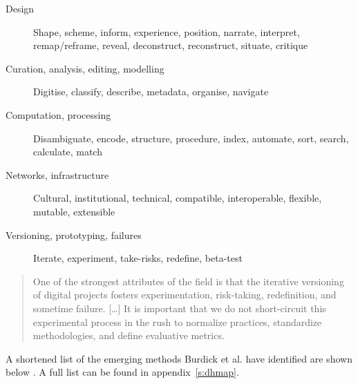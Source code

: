 \begin{description}
  \item [Design] Shape, scheme, inform, experience, position, narrate,
  					interpret, remap/reframe, reveal, deconstruct, reconstruct,
  					situate, critique
  \item [Curation, analysis, editing, modelling] Digitise, classify, describe, metadata, organise, navigate
  \item [Computation, processing] Disambiguate, encode, structure, procedure, index, automate, sort, search, calculate, match
  \item [Networks, infrastructure] Cultural, institutional, technical, compatible, interoperable, flexible, mutable, extensible
  \item [Versioning, prototyping, failures]	Iterate, experiment, take-risks, redefine, beta-test
\end{description}


\begin{quotation}
  One of the strongest attributes of the field is that the iterative versioning of digital projects fosters experimentation, risk-taking, redefinition, and sometime failure. [\ldots] It is important that we do not short-circuit this experimental process in the rush to normalize practices, standardize methodologies, and define evaluative metrics.
\end{quotation}

A shortened list of the emerging methods Burdick et al. have identified are shown below \autocite*{Burdick2012}. A full list can be found in appendix~\ref{s:dhmap}.

